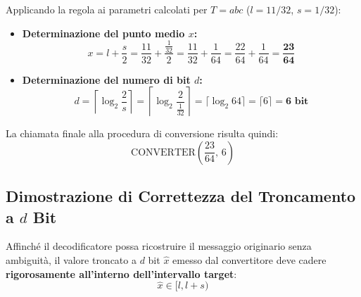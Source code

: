 Applicando la regola ai parametri calcolati per $T = abc$ ($l = 11/32$, $s = 1/32$):
\begin{itemize}
  \item \textbf{Determinazione del punto medio $x$:}
  \begin{equation}
    x = l + \frac{s}{2} = \frac{11}{32} + \frac{\frac{1}{32}}{2} = \frac{11}{32} + \frac{1}{64} = \frac{22}{64} + \frac{1}{64} = \mathbf{\frac{23}{64}}
  \end{equation}
  \item \textbf{Determinazione del numero di bit $d$:}
  \begin{equation}
    d = \left\lceil \log_2 \frac{2}{s} \right\rceil = \left\lceil \log_2 \frac{2}{\frac{1}{32}} \right\rceil = \lceil \log_2 64 \rceil = \lceil 6 \rceil = \mathbf{6\text{ bit}}
  \end{equation}
\end{itemize}
La chiamata finale alla procedura di conversione risulta quindi:
\begin{equation}
  \text{CONVERTER}\left(\frac{23}{64}, \, 6\right)
\end{equation}

\FloatBarrier
\subsection{Dimostrazione di Correttezza del Troncamento a $d$ Bit}
\label{subsec:dimostrazione-correttezza-troncamento}

Affinch\'e il decodificatore possa ricostruire il messaggio originario senza ambiguit\`a, il valore troncato a $d$ bit $\hat{x}$ emesso dal convertitore deve cadere \textbf{rigorosamente all'interno dell'intervallo target}:
\begin{equation}
  \hat{x} \in [l, l + s)
\end{equation}

